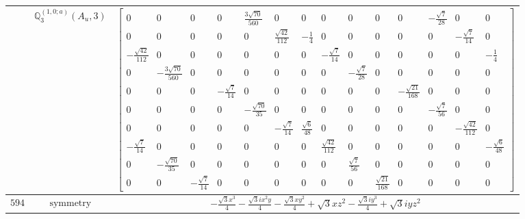 \documentclass[fleqn,8pt,landscape]{jsarticle}
\begin{document}
\begin{longtable}{ccc}
$  $ & $ \mathbb{Q}_{3}^{(1,0;a)}(A_{u},3) $ & $ \begin{bmatrix} 0 & 0 & 0 & 0 & \frac{3 \sqrt{70}}{560} & 0 & 0 & 0 & 0 & 0 & 0 & - \frac{\sqrt{7}}{28} & 0 & 0 \\ 0 & 0 & 0 & 0 & 0 & \frac{\sqrt{42}}{112} & - \frac{1}{4} & 0 & 0 & 0 & 0 & 0 & - \frac{\sqrt{7}}{14} & 0 \\ - \frac{\sqrt{42}}{112} & 0 & 0 & 0 & 0 & 0 & 0 & - \frac{\sqrt{7}}{14} & 0 & 0 & 0 & 0 & 0 & - \frac{1}{4} \\ 0 & - \frac{3 \sqrt{70}}{560} & 0 & 0 & 0 & 0 & 0 & 0 & - \frac{\sqrt{7}}{28} & 0 & 0 & 0 & 0 & 0 \\ 0 & 0 & 0 & - \frac{\sqrt{7}}{14} & 0 & 0 & 0 & 0 & 0 & 0 & - \frac{\sqrt{21}}{168} & 0 & 0 & 0 \\ 0 & 0 & 0 & 0 & - \frac{\sqrt{70}}{35} & 0 & 0 & 0 & 0 & 0 & 0 & - \frac{\sqrt{7}}{56} & 0 & 0 \\ 0 & 0 & 0 & 0 & 0 & - \frac{\sqrt{7}}{14} & \frac{\sqrt{6}}{48} & 0 & 0 & 0 & 0 & 0 & - \frac{\sqrt{42}}{112} & 0 \\ - \frac{\sqrt{7}}{14} & 0 & 0 & 0 & 0 & 0 & 0 & \frac{\sqrt{42}}{112} & 0 & 0 & 0 & 0 & 0 & - \frac{\sqrt{6}}{48} \\ 0 & - \frac{\sqrt{70}}{35} & 0 & 0 & 0 & 0 & 0 & 0 & \frac{\sqrt{7}}{56} & 0 & 0 & 0 & 0 & 0 \\ 0 & 0 & - \frac{\sqrt{7}}{14} & 0 & 0 & 0 & 0 & 0 & 0 & \frac{\sqrt{21}}{168} & 0 & 0 & 0 & 0 \end{bmatrix} $ \\ \hline
$ 594 $ & $ \text{symmetry} $ & $ - \frac{\sqrt{3} x^{3}}{4} - \frac{\sqrt{3} i x^{2} y}{4} - \frac{\sqrt{3} x y^{2}}{4} + \sqrt{3} x z^{2} - \frac{\sqrt{3} i y^{3}}{4} + \sqrt{3} i y z^{2} $ \\

\end{longtable}
\end{document}
